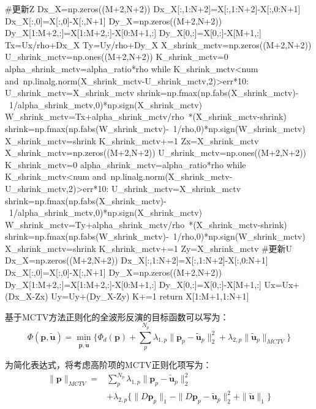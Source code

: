\documentclass[12pt]{article}
\begin{document}
\begin{python}
        #更新Z
        Dx_X=np.zeros((M+2,N+2))
        Dx_X[:,1:N+2]=X[:,1:N+2]-X[:,0:N+1]
        Dx_X[:,0]=X[:,0]-X[:,N+1]
        Dy_X=np.zeros((M+2,N+2))
        Dy_X[1:M+2,:]=X[1:M+2,:]-X[0:M+1,:]
        Dy_X[0,:]=X[0,:]-X[M+1,:]
        Tx=Ux/rho+Dx_X
        Ty=Uy/rho+Dy_X
        X_shrink_mctv=np.zeros((M+2,N+2))
        U_shrink_mctv=np.ones((M+2,N+2))
        K_shrink_mctv=0
        alpha_shrink_mctv=alpha_ratio*rho
        while K_shrink_mctv<num and\
        np.linalg.norm(X_shrink_mctv-U_shrink_mctv,2)>err*10:
            U_shrink_mctv=X_shrink_mctv
            shrink=np.fmax(np.fabs(X_shrink_mctv)-\
            1/alpha_shrink_mctv,0)*np.sign(X_shrink_mctv)
            W_shrink_mctv=Tx+alpha_shrink_mctv/rho\
            *(X_shrink_mctv-shrink)
            shrink=np.fmax(np.fabs(W_shrink_mctv)-\
            1/rho,0)*np.sign(W_shrink_mctv)
            X_shrink_mctv=shrink
            K_shrink_mctv+=1
        Zx=X_shrink_mctv
        X_shrink_mctv=np.zeros((M+2,N+2))
        U_shrink_mctv=np.ones((M+2,N+2))
        K_shrink_mctv=0
        alpha_shrink_mctv=alpha_ratio*rho
        while K_shrink_mctv<num and\
        np.linalg.norm(X_shrink_mctv-U_shrink_mctv,2)>err*10:
            U_shrink_mctv=X_shrink_mctv
            shrink=np.fmax(np.fabs(X_shrink_mctv)-\
            1/alpha_shrink_mctv,0)*np.sign(X_shrink_mctv)
            W_shrink_mctv=Ty+alpha_shrink_mctv/rho\
            *(X_shrink_mctv-shrink)
            shrink=np.fmax(np.fabs(W_shrink_mctv)-\
            1/rho,0)*np.sign(W_shrink_mctv)
            X_shrink_mctv=shrink
            K_shrink_mctv+=1
        Zy=X_shrink_mctv
        #更新U
        Dx_X=np.zeros((M+2,N+2))
        Dx_X[:,1:N+2]=X[:,1:N+2]-X[:,0:N+1]
        Dx_X[:,0]=X[:,0]-X[:,N+1]
        Dy_X=np.zeros((M+2,N+2))
        Dy_X[1:M+2,:]=X[1:M+2,:]-X[0:M+1,:]
        Dy_X[0,:]=X[0,:]-X[M+1,:]
        Ux=Ux+(Dx_X-Zx)
        Uy=Uy+(Dy_X-Zy)
        K+=1
    return X[1:M+1,1:N+1]
\end{python}
\par
基于MCTV方法正则化的全波形反演的目标函数可以写为：
\begin{equation}\label{4-42}
\Phi(\boldsymbol{p},\tilde{\boldsymbol{u}})=\min_{\boldsymbol{p},\tilde{\boldsymbol{u}}}\{\Phi_d(\boldsymbol{p})+\sum_p^{N_p}\lambda_{1,p} \parallel \boldsymbol{p}_p-\tilde{\boldsymbol{u}}_p \parallel_2^2+\lambda_{2,p}\parallel \tilde{\boldsymbol{u}}_p \parallel_{MCTV}\}
\end{equation}
\par
为简化表达式，将考虑高阶项的MCTV正则化项写为：
\begin{equation}\label{4-43}
\begin{aligned}
\parallel \boldsymbol{p} \parallel_{MCTV}=&\sum_p^{N_p}\lambda_{1,p} \parallel \boldsymbol{p}_p-\tilde{\boldsymbol{u}}_p \parallel_2^2\\
&+\lambda_{2,p}\{\parallel D\boldsymbol{p}_p \parallel_1-\parallel D\boldsymbol{p}_p-\tilde {\boldsymbol{u}}_p \parallel_2^2+\parallel \tilde{\boldsymbol{u}} \parallel_1\}
\end{aligned}
\end{equation}
\end{document}
